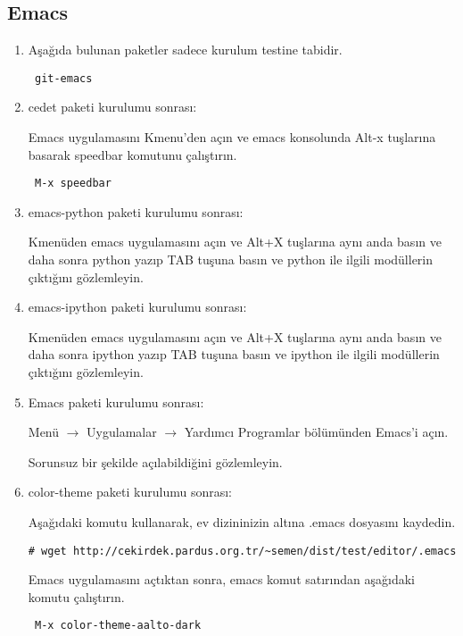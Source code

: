 \documentclass[a4paper,10pt]{article}
\begin{document}
\subsection*{Emacs}
\begin{enumerate}
\item Aşağıda bulunan paketler sadece kurulum testine tabidir.
\begin{verbatim}
 git-emacs
\end{verbatim}

\item cedet paketi kurulumu sonrası:
 
Emacs uygulamasını Kmenu'den açın ve emacs konsolunda Alt-x tuşlarına basarak speedbar komutunu çalıştırın.
\begin{verbatim}
 M-x speedbar
\end{verbatim}

\item emacs-python paketi kurulumu sonrası:

Kmenüden emacs uygulamasını açın ve Alt+X tuşlarına aynı anda basın ve daha sonra python yazıp TAB tuşuna basın ve python ile ilgili modüllerin çıktığını gözlemleyin.

\item emacs-ipython paketi kurulumu sonrası:

Kmenüden emacs uygulamasını açın ve Alt+X tuşlarına aynı anda basın ve daha sonra ipython yazıp TAB tuşuna basın ve ipython ile ilgili modüllerin çıktığını gözlemleyin.

\item Emacs paketi kurulumu sonrası:

Menü $\rightarrow$ Uygulamalar $\rightarrow$ Yardımcı Programlar bölümünden Emacs'i açın.

Sorunsuz bir şekilde açılabildiğini gözlemleyin.

\item color-theme paketi kurulumu sonrası:


Aşağıdaki komutu kullanarak, ev dizininizin altına .emacs dosyasını kaydedin.
\begin{verbatim}
# wget http://cekirdek.pardus.org.tr/~semen/dist/test/editor/.emacs 
\end{verbatim}

Emacs uygulamasını açtıktan sonra, emacs komut satırından aşağıdaki komutu çalıştırın.
\begin{verbatim}
 M-x color-theme-aalto-dark
\end{verbatim}


\end{enumerate}
\end{document}
